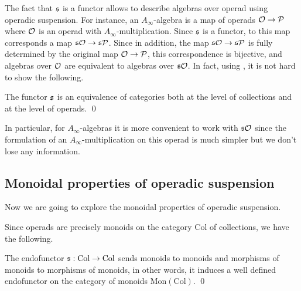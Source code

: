 \documentclass[join.tex]{subfiles}
\begin{document}
The fact that $\mathfrak{s}$ is a functor allows to describe algebras over operad using operadic suspension. For instance, an $A_\infty$-algebra is a map of operads ${\mathcal O}\to\mathcal{P}$ where ${\mathcal O}$ is an operad with $A_\infty$-multiplication. Since $\mathfrak{s}$ is a functor, to this map corresponds a map $\mathfrak{s}{\mathcal O}\to\mathfrak{s}\mathcal{P}$. Since in addition, the map $\mathfrak{s}{\mathcal O}\to\mathfrak{s}\mathcal{P}$ is fully determined by the original map ${\mathcal O}\to\mathcal{P}$, this correspondence is bijective, and algebras over ${\mathcal O}$ are equivalent to algebras over $\mathfrak{s}{\mathcal O}$. In fact, using , it is not hard to show the following.

\begin{propo}
The functor $\mathfrak{s}$ is an equivalence of categories both at the level of collections and at the level of operads. \qed %
\end{propo}
In particular, for $A_\infty$-algebras it is more convenient to work with $\mathfrak{s}{\mathcal O}$ since the formulation of an $A_\infty$-multiplication on this operad is much simpler but we don't lose any information.




\subsection{Monoidal properties of operadic suspension}\label{monoidalsusp}
Now we are going to explore the monoidal properties of operadic suspension.

Since operads are precisely monoids on the category $\mathrm{Col}$ of collections, we have the following.
\begin{propo}\label{monoidality} %
The endofunctor $\mathfrak{s}:\mathrm{Col}\to\mathrm{Col}$ sends monoids to monoids and morphisms of monoids to morphisms of monoids, in other words, it induces a well defined endofunctor on the category of monoids $\mathrm{Mon}(\mathrm{Col})$. \qed%


\end{propo}
\end{document}
